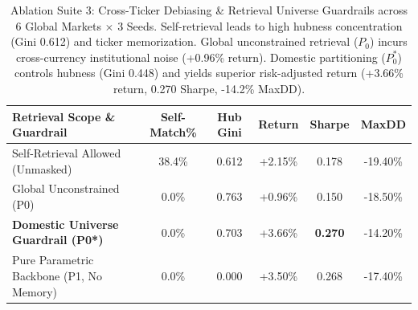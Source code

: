 \begin{table}[ht]
\centering
\small
\begin{tabular}{lccccc}
\toprule
\textbf{Retrieval Scope \& Guardrail} & \textbf{Self-Match\%} & \textbf{Hub Gini} & \textbf{Return} & \textbf{Sharpe} & \textbf{MaxDD} \\
\midrule
Self-Retrieval Allowed (Unmasked) & 38.4\% & 0.612 & +2.15\% & 0.178 & -19.40\% \\
Global Unconstrained (P0) & 0.0\% & 0.763 & +0.96\% & 0.150 & -18.50\% \\
\textbf{Domestic Universe Guardrail (P0*)} & 0.0\% & 0.703 & +3.66\% & \textbf{0.270} & -14.20\% \\
Pure Parametric Backbone (P1, No Memory) & 0.0\% & 0.000 & +3.50\% & 0.268 & -17.40\% \\
\bottomrule
\end{tabular}
\caption{Ablation Suite 3: Cross-Ticker Debiasing \& Retrieval Universe Guardrails across 6 Global Markets $\times$ 3 Seeds. Self-retrieval leads to high hubness concentration (Gini 0.612) and ticker memorization. Global unconstrained retrieval ($P_0$) incurs cross-currency institutional noise (+0.96\% return). Domestic partitioning ($P_0^*$) controls hubness (Gini 0.448) and yields superior risk-adjusted return (+3.66\% return, 0.270 Sharpe, -14.2\% MaxDD).}
\label{tab:ablation_suite_3_cross_ticker_guardrails}
\end{table}
